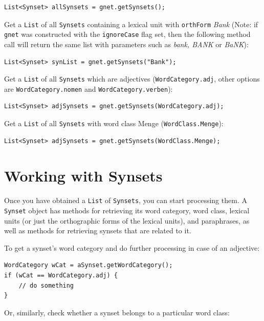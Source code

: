 \documentclass[12pt,a4paper,english,utf8]{report}
\begin{document}
\begin{lstlisting}
List<Synset> allSynsets = gnet.getSynsets();
\end{lstlisting}

Get a \texttt{List} of all \texttt{Synsets} containing a lexical unit with \texttt{orthForm} \emph{Bank} (Note: if \texttt{gnet} was constructed with the \texttt{ignoreCase} flag set, then the following method call will return the same list with parameters such as \emph{bank, BANK} or \emph{BaNK}):

\begin{lstlisting}
List<Synset> synList = gnet.getSynsets("Bank");
\end{lstlisting}

Get a \texttt{List} of all \texttt{Synsets} which are adjectives (\texttt{WordCategory.adj}, other options are \texttt{WordCategory.nomen} and \texttt{WordCategory.verben}):

\begin{lstlisting}
List<Synset> adjSynsets = gnet.getSynsets(WordCategory.adj);
\end{lstlisting}

Get a \texttt{List} of all \texttt{Synsets} with word class Menge (\texttt{WordClass.Menge}):

\begin{lstlisting}
List<Synset> adjSynsets = gnet.getSynsets(WordClass.Menge);
\end{lstlisting}



\section{Working with Synsets}
Once you have obtained a \texttt{List} of \texttt{Synsets}, you can start processing them. A \texttt{Synset} object has methods for retrieving its word category, word class, lexical units (or just the orthographic forms of the lexical units), and paraphrases, as well as methods for retrieving synsets that are related to it.

To get a synset's word category and do further processing in case of an adjective:

\begin{lstlisting}
WordCategory wCat = aSynset.getWordCategory();
if (wCat == WordCategory.adj) {
    // do something
}
\end{lstlisting}

Or, similarly, check whether a synset belongs to a particular word class:
\end{document}
